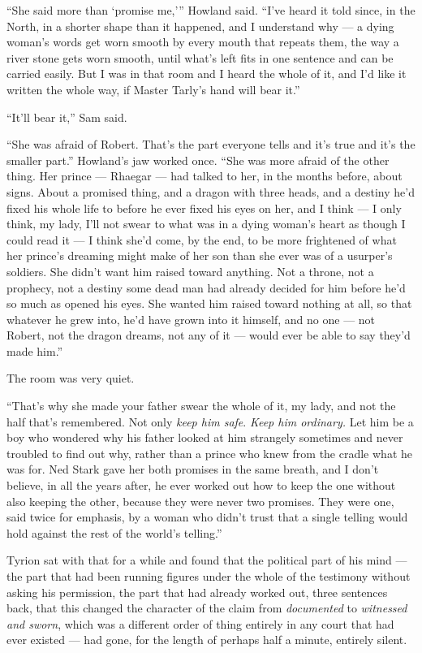 \sceneBreak

“She said more than ‘promise me,’” Howland said. “I’ve heard it told since, in the North, in a shorter shape than it happened, and I understand why — a dying woman’s words get worn smooth by every mouth that repeats them, the way a river stone gets worn smooth, until what’s left fits in one sentence and can be carried easily. But I was in that room and I heard the whole of it, and I’d like it written the whole way, if Master Tarly’s hand will bear it.”

“It’ll bear it,” Sam said.

“She was afraid of Robert. That’s the part everyone tells and it’s true and it’s the smaller part.” Howland’s jaw worked once. “She was more afraid of the other thing. Her prince — Rhaegar — had talked to her, in the months before, about signs. About a promised thing, and a dragon with three heads, and a destiny he’d fixed his whole life to before he ever fixed his eyes on her, and I think — I only think, my lady, I’ll not swear to what was in a dying woman’s heart as though I could read it — I think she’d come, by the end, to be more frightened of what her prince’s dreaming might make of her son than she ever was of a usurper’s soldiers. She didn’t want him raised toward anything. Not a throne, not a prophecy, not a destiny some dead man had already decided for him before he’d so much as opened his eyes. She wanted him raised toward nothing at all, so that whatever he grew into, he’d have grown into it himself, and no one — not Robert, not the dragon dreams, not any of it — would ever be able to say they’d made him.”

The room was very quiet.

“That’s why she made your father swear the whole of it, my lady, and not the half that’s remembered. Not only \textit{keep him safe}. \textit{Keep him ordinary.} Let him be a boy who wondered why his father looked at him strangely sometimes and never troubled to find out why, rather than a prince who knew from the cradle what he was for. Ned Stark gave her both promises in the same breath, and I don’t believe, in all the years after, he ever worked out how to keep the one without also keeping the other, because they were never two promises. They were one, said twice for emphasis, by a woman who didn’t trust that a single telling would hold against the rest of the world’s telling.”

\sceneBreak

Tyrion sat with that for a while and found that the political part of his mind — the part that had been running figures under the whole of the testimony without asking his permission, the part that had already worked out, three sentences back, that this changed the character of the claim from \textit{documented} to \textit{witnessed and sworn}, which was a different order of thing entirely in any court that had ever existed — had gone, for the length of perhaps half a minute, entirely silent.

